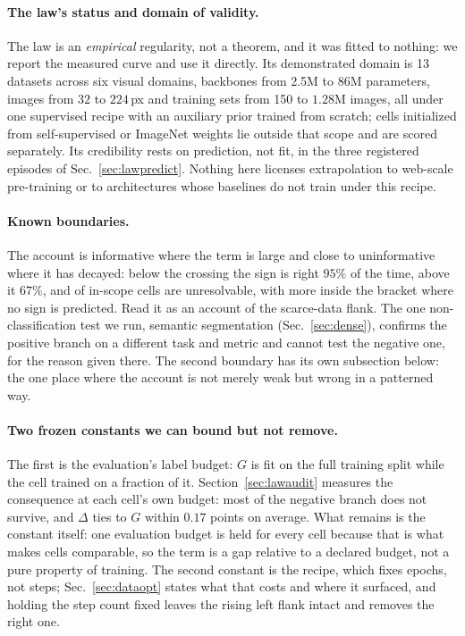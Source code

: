 \paragraph{The law's status and domain of validity.} The law is an
\emph{empirical} regularity, not a theorem, and it was fitted to nothing: we
report the measured \readout{} curve and use it directly. Its demonstrated domain
is 13 datasets across six visual domains, backbones from 2.5M to 86M
parameters, images from $32$ to $224$\,px and training sets from 150 to $1.28$M
images, all under one supervised recipe with an auxiliary prior trained from
scratch; cells initialized from self-supervised or ImageNet weights lie outside
that scope and are scored separately. Its credibility rests on prediction, not
fit, in the three registered episodes of Sec.~\ref{sec:lawpredict}. Nothing
here licenses extrapolation to web-scale pre-training or to architectures whose
baselines do not train under this recipe.

\paragraph{Known boundaries.} The account is informative where the \readout{} term
is large and close to uninformative where it has decayed: below the crossing
the sign is right $95\%$ of the time, above it $67\%$, and \auditUnresolved{}
of \auditScope{} in-scope cells are unresolvable, with \auditBracket{} more
inside the bracket where no sign is predicted. Read it as an account of
the scarce-data flank. The one non-classification test we run, semantic
segmentation (Sec.~\ref{sec:dense}), confirms the positive branch on a
different task and metric and cannot test the negative one, for the reason
given there. The second boundary has its own subsection below: the one place where the
account is not merely weak but wrong in a patterned way.

\paragraph{Two frozen constants we can bound but not remove.} 
The first is the evaluation's label budget: $G$ is fit on the full training
split while the cell trained on a fraction of it. Section~\ref{sec:lawaudit}
measures the consequence at each cell's own budget: most of the negative
branch does not survive, and $\Delta$ ties to $G$ within
$0.17$ points on average. What remains is the constant itself:
one evaluation budget is held for every cell because that is what makes cells
comparable, so the \readout{} term is a gap relative to a declared
budget, not a pure property of training. The second constant is the recipe,
which fixes epochs, not steps;
Sec.~\ref{sec:dataopt} states what
that costs and where it surfaced, and holding the step count fixed leaves the
rising left flank intact and removes the right one.


